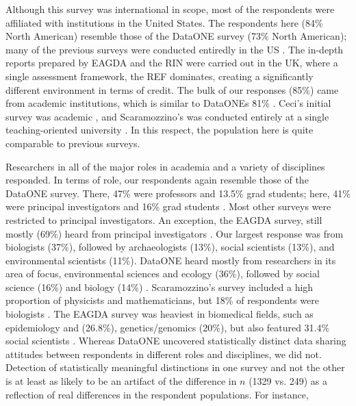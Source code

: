 \documentclass[10pt]{article}
\begin{document}
Although this survey was international in scope, most of the respondents were affiliated with institutions in the United States.
The respondents here (84\% North American) resemble those of the DataONE survey \cite{tenopir_data_2011} (73\% North American); many of the previous surveys were conducted entiredly in the US \cite{ceci_scientists_1988, kim_institutional_2012, scaramozzino_study_2012}.
The in-depth reports prepared by EAGDA \cite{bobrow_establishing_2014} and the RIN \cite{swan_share_2008} were carried out in the UK, where a single assessment framework, the REF dominates, creating a significantly different environment in terms of credit.
The bulk of our responses (85\%) came from academic institutions, which is similar to DataONEs 81\% \cite{tenopir_data_2011}.  
Ceci's initial survey was academic \cite{ceci_scientists_1988}, and Scaramozzino's was conducted entirely at a single teaching-oriented university \cite{scaramozzino_study_2012}.
In this respect, the population here is quite comparable to previous surveys.

Researchers in all of the major roles in academia and a variety of disciplines responded.
In terms of role, our respondents again resemble those of the DataONE survey.
There, 47\% were professors and 13.5\% grad students; here, 41\% were principal investigators and 16\% grad students \cite{tenopir_data_2011}.
Most other surveys were restricted to principal investigators.
An exception, the EAGDA survey, still mostly (69\%) heard from principal investigators \cite{bobrow_establishing_2014}.
Our largest response was from biologists (37\%), followed by archaeologists (13\%), social scientists (13\%), and environmental scientists (11\%). 
DataONE heard mostly from researchers in its area of focus, environmental sciences and ecology (36\%), followed by social science (16\%) and biology (14\%) \cite{tenopir_data_2011}. 
Scaramozzino's survey included a high proportion of physicists and mathematicians, but 18\% of respondents were biologists \cite{scaramozzino_study_2012}.
The EAGDA survey was heaviest in biomedical fields, such as epidemiology and (26.8\%), genetics/genomics (20\%), but also featured 31.4\% social scientists \cite{bobrow_establishing_2014}. 
Whereas DataONE uncovered statistically distinct data sharing attitudes between respondents in different roles and disciplines, we did not.
Detection of statistically meaningful distinctions in one survey and not the other is at least as likely to be an artifact of the difference in $n$ (1329 vs. 249) as a reflection of real differences in the respondent populations.
For instance, 
\end{document}
